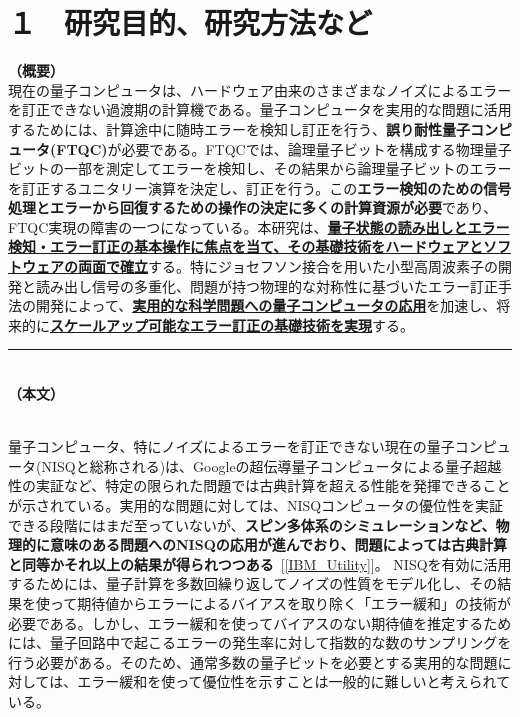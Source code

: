 \documentclass[11pt,a4j,dvipdfmx]{jarticle} 					%
\newcommand{\研究課題名}{誤り耐性量子コンピュータに向けた誤り訂正技術の開発(仮)}
\newcommand{\研究機関名}{東京大学}
\newcommand{\研究代表者氏名}{寺師弘二}
\newcommand{\研究期間の最終元号年度}{10}  %
\newcommand{\mybf}[1]{{\bfseries\sffamily#1}}
\begin{document}

\section{１　研究目的、研究方法など}

\noindent
\textbf{（概要）}\\
現在の量子コンピュータは、ハードウェア由来のさまざまなノイズによるエラーを訂正できない過渡期の計算機である。量子コンピュータを実用的な問題に活用するためには、計算途中に随時エラーを検知し訂正を行う、\mybf{誤り耐性量子コンピュータ(FTQC)}が必要である。FTQCでは、論理量子ビットを構成する物理量子ビットの一部を測定してエラーを検知し、その結果から論理量子ビットのエラーを訂正するユニタリー演算を決定し、訂正を行う。この\mybf{エラー検知のための信号処理とエラーから回復するための操作の決定に多くの計算資源が必要}であり、 FTQC実現の障害の一つになっている。本研究は、\mybf{\ul{量子状態の読み出しとエラー検知・エラー訂正の基本操作に焦点を当て、その基礎技術をハードウェアとソフトウェアの両面で確立}}する。特にジョセフソン接合を用いた小型高周波素子の開発と読み出し信号の多重化、問題が持つ物理的な対称性に基づいたエラー訂正手法の開発によって、\mybf{\ul{実用的な科学問題への量子コンピュータの応用}}を加速し、将来的に\mybf{\ul{スケールアップ可能なエラー訂正の基礎技術を実現}}する。

\noindent
\rule{\linewidth}{1pt}\\
\noindent
\textbf{（本文）}

\\
量子コンピュータ、特にノイズによるエラーを訂正できない現在の量子コンピュータ(NISQと総称される)は、Googleの超伝導量子コンピュータによる量子超越性の実証など、特定の限られた問題では古典計算を超える性能を発揮できることが示されている。実用的な問題に対しては、NISQコンピュータの優位性を実証できる段階にはまだ至っていないが、\mybf{スピン多体系のシミュレーションなど、物理的に意味のある問題へのNISQの応用が進んでおり、問題によっては古典計算と同等かそれ以上の結果が得られつつある}~[\ref{IBM_Utility}]。
NISQを有効に活用するためには、量子計算を多数回繰り返してノイズの性質をモデル化し、その結果を使って期待値からエラーによるバイアスを取り除く「エラー緩和」の技術が必要である。しかし、エラー緩和を使ってバイアスのない期待値を推定するためには、量子回路中で起こるエラーの発生率に対して指数的な数のサンプリングを行う必要がある。そのため、通常多数の量子ビットを必要とする実用的な問題に対しては、エラー緩和を使って優位性を示すことは一般的に難しいと考えられている。
\end{document}
